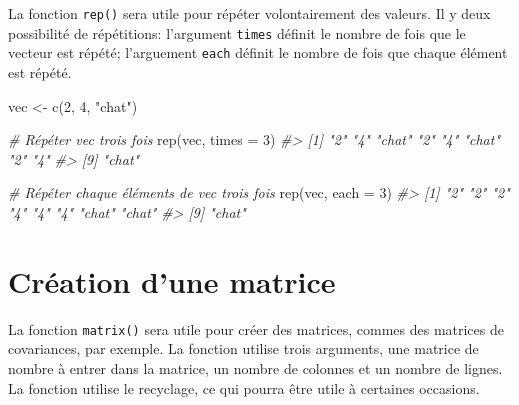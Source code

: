 \documentclass[
]{book}
\newenvironment{Shaded}{}{}
\newcommand{\AttributeTok}[1]{#1}
\newcommand{\CommentTok}[1]{\textit{#1}}
\newcommand{\DecValTok}[1]{#1}
\newcommand{\FunctionTok}[1]{#1}
\newcommand{\NormalTok}[1]{#1}
\newcommand{\OtherTok}[1]{#1}
\newcommand{\StringTok}[1]{#1}
\begin{document}
La fonction \texttt{rep()} sera utile pour répéter volontairement des valeurs. Il y deux possibilité de répétitions: l'argument \texttt{times} définit le nombre de fois que le vecteur est répété; l'arguement \texttt{each} définit le nombre de fois que chaque élément est répété.

\begin{Shaded}
\begin{Highlighting}[]
\NormalTok{vec }\OtherTok{\textless{}{-}} \FunctionTok{c}\NormalTok{(}\DecValTok{2}\NormalTok{, }\DecValTok{4}\NormalTok{, }\StringTok{"chat"}\NormalTok{)}

\CommentTok{\# Répéter vec trois fois}
\FunctionTok{rep}\NormalTok{(vec, }\AttributeTok{times =} \DecValTok{3}\NormalTok{)}
\CommentTok{\#\textgreater{} [1] "2"    "4"    "chat" "2"    "4"    "chat" "2"    "4"   }
\CommentTok{\#\textgreater{} [9] "chat"}

\CommentTok{\# Répéter chaque éléments de vec trois fois}
\FunctionTok{rep}\NormalTok{(vec, }\AttributeTok{each =} \DecValTok{3}\NormalTok{)}
\CommentTok{\#\textgreater{} [1] "2"    "2"    "2"    "4"    "4"    "4"    "chat" "chat"}
\CommentTok{\#\textgreater{} [9] "chat"}
\end{Highlighting}
\end{Shaded}

\hypertarget{cruxe9ation-dune-matrice}{%
\section{Création d'une matrice}\label{cruxe9ation-dune-matrice}}

La fonction \texttt{matrix()} sera utile pour créer des matrices, commes des matrices de covariances, par exemple. La fonction utilise trois arguments, une matrice de nombre à entrer dans la matrice, un nombre de colonnes et un nombre de lignes. La fonction utilise le recyclage, ce qui pourra être utile à certaines occasions.
\end{document}

